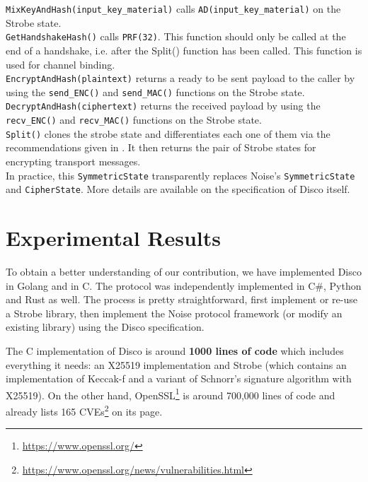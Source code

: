 \documentclass{article}
\begin{document}
\texttt{MixKeyAndHash(input_key_material)} calls \texttt{AD(input_key_material)} on the Strobe state.\\

\texttt{GetHandshakeHash()} calls \texttt{PRF(32)}. This function should only be called at the end of a handshake, i.e. after the Split() function has been called. This function is used for channel binding\cite[Section 11.2]{noise}.\\

\texttt{EncryptAndHash(plaintext)} returns a ready to be sent payload to the caller by using the \texttt{send_ENC()} and \texttt{send_MAC()} functions on the Strobe state.\\

\texttt{DecryptAndHash(ciphertext)} returns the received payload by using the \texttt{recv_ENC()} and \texttt{recv_MAC()} functions on the Strobe state.\\

\texttt{Split()} clones the strobe state and differentiates each one of them via the recommendations given in \cite[Appendix C.1.]{strobe}. It then returns the pair of Strobe states for encrypting transport messages.\\

In practice, this \texttt{SymmetricState} transparently replaces Noise's \texttt{SymmetricState} and \texttt{CipherState}. More details are available on the specification of Disco itself\cite{disco}.

\section{Experimental Results}

To obtain a better understanding of our contribution, we have implemented Disco in Golang\cite{libdisco} and in C\cite{disco-c}. The protocol was independently implemented in C\#\cite{discoNet}, Python\cite{PyDisco} and Rust\cite{disco-rs} as well. The process is pretty straightforward, first implement or re-use a Strobe library, then implement the Noise protocol framework (or modify an existing library) using the Disco specification.

The C implementation of Disco is around \textbf{1000 lines of code} which includes everything it needs: an X25519 implementation and Strobe (which contains an implementation of Keccak-f and a variant of Schnorr's signature algorithm with X25519). On the other hand, OpenSSL\footnote{\url{https://www.openssl.org/}} is around 700,000 lines of code and already lists 165 CVEs\footnote{\url{https://www.openssl.org/news/vulnerabilities.html}} on its page.
\end{document}
